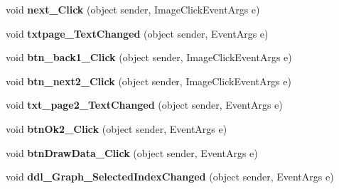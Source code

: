\begin{DoxyCompactItemize}
\item 
\hypertarget{classusertrackmyhealth__position_a388ef804e4ba5a6f9c0ccf8c72564189}{void {\bfseries next\-\_\-\-Click} (object sender, Image\-Click\-Event\-Args e)}\label{classusertrackmyhealth__position_a388ef804e4ba5a6f9c0ccf8c72564189}

\item 
\hypertarget{classusertrackmyhealth__position_a59ddddfb77167a2c586cbb2bd3ff27df}{void {\bfseries txtpage\-\_\-\-Text\-Changed} (object sender, Event\-Args e)}\label{classusertrackmyhealth__position_a59ddddfb77167a2c586cbb2bd3ff27df}

\item 
\hypertarget{classusertrackmyhealth__position_a549c5becea515027905bb0467c37dada}{void {\bfseries btn\-\_\-back1\-\_\-\-Click} (object sender, Image\-Click\-Event\-Args e)}\label{classusertrackmyhealth__position_a549c5becea515027905bb0467c37dada}

\item 
\hypertarget{classusertrackmyhealth__position_aba749dc4ea123b7faf89d1863a780cc9}{void {\bfseries btn\-\_\-next2\-\_\-\-Click} (object sender, Image\-Click\-Event\-Args e)}\label{classusertrackmyhealth__position_aba749dc4ea123b7faf89d1863a780cc9}

\item 
\hypertarget{classusertrackmyhealth__position_a6874f6e5e168d18558154929045b2d9a}{void {\bfseries txt\-\_\-page2\-\_\-\-Text\-Changed} (object sender, Event\-Args e)}\label{classusertrackmyhealth__position_a6874f6e5e168d18558154929045b2d9a}

\item 
\hypertarget{classusertrackmyhealth__position_aae18f998865c6ea366c0c0532a31fd30}{void {\bfseries btn\-Ok2\-\_\-\-Click} (object sender, Event\-Args e)}\label{classusertrackmyhealth__position_aae18f998865c6ea366c0c0532a31fd30}

\item 
\hypertarget{classusertrackmyhealth__position_a477888904eb6d39066b4cdb601ce7162}{void {\bfseries btn\-Draw\-Data\-\_\-\-Click} (object sender, Event\-Args e)}\label{classusertrackmyhealth__position_a477888904eb6d39066b4cdb601ce7162}

\item 
\hypertarget{classusertrackmyhealth__position_a6f82d27b66f1c20eb55c7dde0dd8b806}{void {\bfseries ddl\-\_\-\-Graph\-\_\-\-Selected\-Index\-Changed} (object sender, Event\-Args e)}\label{classusertrackmyhealth__position_a6f82d27b66f1c20eb55c7dde0dd8b806}


\end{DoxyCompactItemize}
